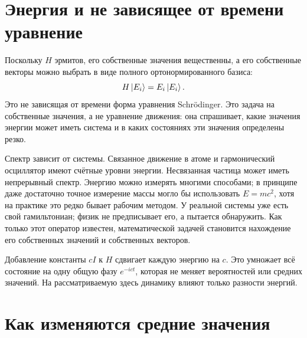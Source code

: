 \begin{classroomqa}
\end{classroomqa}

\section{Энергия и не зависящее от времени уравнение}

Поскольку \(H\) эрмитов, его собственные значения вещественны, а его собственные векторы можно выбрать в виде полного ортонормированного базиса:
\begin{equation}
H\left\lvert E_i\right\rangle=E_i\left\lvert E_i\right\rangle.
\label{eq:l5-time-independent}
\end{equation}
Это не зависящая от времени форма уравнения Schr\"odinger. Это задача на собственные значения, а не уравнение движения: она спрашивает, какие значения энергии может иметь система и в каких состояниях эти значения определены резко.

Спектр зависит от системы. Связанное движение в атоме и гармонический осциллятор имеют счётные уровни энергии. Несвязанная частица может иметь непрерывный спектр. Энергию можно измерять многими способами; в принципе даже достаточно точное измерение массы могло бы использовать \(E=mc^2\), хотя на практике это редко бывает рабочим методом. У реальной системы уже есть свой гамильтониан; физик не предписывает его, а пытается обнаружить. Как только этот оператор известен, математической задачей становится нахождение его собственных значений и собственных векторов.

Добавление константы \(cI\) к \(H\) сдвигает каждую энергию на \(c\). Это умножает всё состояние на одну общую фазу \(e^{-ict}\), которая не меняет вероятностей или средних значений. На рассматриваемую здесь динамику влияют только разности энергий.

\section{Как изменяются средние значения}

